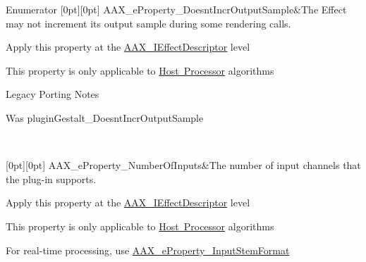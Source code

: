 \begin{DoxyEnumFields}{Enumerator}
[0pt][0pt]{}\mbox{\label{a00662_a13e384f22825afd3db6d68395b79ce0daaf6b47f0861af74ef5c5bb316481b97d}} 
A\+A\+X\+\_\+e\+Property\+\_\+\+Doesnt\+Incr\+Output\+Sample&The Effect may not increment its output sample during some rendering calls. \begin{DoxyItemize}
\item Apply this property at the \mbox{\hyperlink{a01813}{A\+A\+X\+\_\+\+I\+Effect\+Descriptor}} level \item This property is only applicable to \mbox{\hyperlink{a00804}{Host Processor}} algorithms\end{DoxyItemize}
\begin{DoxyRefDesc}{Legacy Porting Notes}
\item[\mbox{\hyperlink{a00787__porting_notes000056}{Legacy Porting Notes}}]Was plugin\+Gestalt\+\_\+\+Doesnt\+Incr\+Output\+Sample \end{DoxyRefDesc}
\\
\hline

[0pt][0pt]{}\mbox{\label{a00662_a13e384f22825afd3db6d68395b79ce0da00ed3da39077c52ef259f350837fc981}} 
A\+A\+X\+\_\+e\+Property\+\_\+\+Number\+Of\+Inputs&The number of input channels that the plug-\/in supports. \begin{DoxyItemize}
\item Apply this property at the \mbox{\hyperlink{a01813}{A\+A\+X\+\_\+\+I\+Effect\+Descriptor}} level \item This property is only applicable to \mbox{\hyperlink{a00804}{Host Processor}} algorithms\end{DoxyItemize}
For real-\/time processing, use \mbox{\hyperlink{a00662_a13e384f22825afd3db6d68395b79ce0dadebf03028b758123965a8b988fa2df99}{A\+A\+X\+\_\+e\+Property\+\_\+\+Input\+Stem\+Format}} \\
\hline


\end{DoxyEnumFields}
